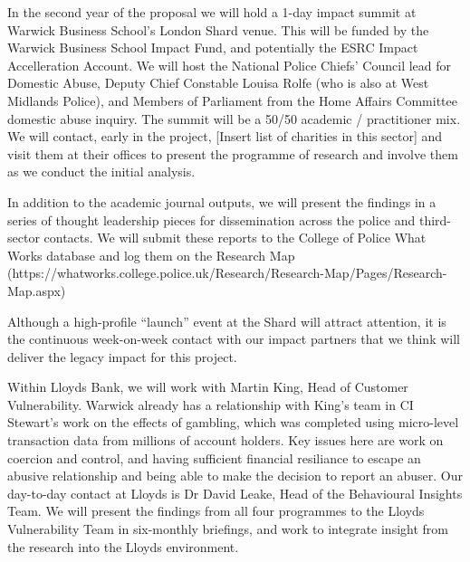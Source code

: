 \documentclass[11pt, a4paper]{article}
\newcommand{\TM}[1] {{\textcolor{orange}{#1}}}
\begin{document}
In the second year of the proposal we will hold a 1-day impact summit at Warwick Business School's London Shard venue. This will be funded by the Warwick Business School Impact Fund, and potentially the ESRC Impact Accelleration Account. We will host the National Police Chiefs' Council lead for Domestic Abuse, Deputy Chief Constable Louisa Rolfe (who is also at West Midlands Police), and Members of Parliament from the Home Affairs Committee domestic abuse inquiry. The summit will be a 50/50 academic / practitioner mix. We will contact, early in the project, [Insert list of charities in this sector] and visit them at their offices to present the programme of research and involve them as we conduct the initial analysis.

In addition to the academic journal outputs, we will present the findings in a series of thought leadership pieces for dissemination across the police and third-sector contacts. We will submit these reports to the College of Police What Works database and log them on the Research Map (https://whatworks.college.police.uk/Research/Research-Map/Pages/Research-Map.aspx)

Although a high-profile ``launch'' event at the Shard will attract attention, it is the continuous week-on-week contact with our impact partners that we think will deliver the legacy impact for this project.


Within Lloyds Bank, we will work with Martin King, Head of Customer Vulnerability. Warwick already has a relationship with King's team in CI Stewart's work on the effects of gambling, which was completed using micro-level transaction data from millions of account holders. Key issues here are work on coercion and control, and having sufficient financial resiliance to escape an abusive relationship and being able to make the decision to report an abuser. Our day-to-day contact at Lloyds is Dr David Leake, Head of the Behavioural Insights Team. We will present the findings from all four programmes to the Lloyds Vulnerability Team in six-monthly briefings, and work to integrate insight from the research into the Lloyds environment. 



\end{document}
